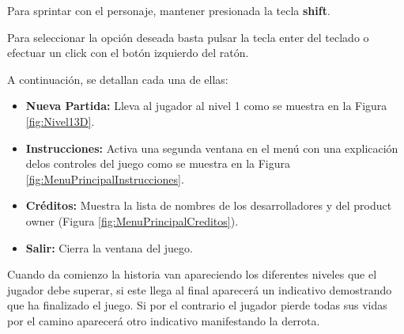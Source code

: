 Para sprintar con el personaje, mantener presionada la tecla \textbf{shift}.

Para seleccionar la opción deseada basta pulsar la tecla enter del teclado o efectuar un click con el botón izquierdo del ratón.

A continuación, se detallan cada una de ellas: 
\begin{itemize}
	\item \textbf{Nueva Partida:} Lleva al jugador al nivel 1 como se muestra en la Figura \ref{fig:Nivel13D}.	
	\item \textbf{Instrucciones:} Activa una segunda ventana en el menú con una explicación delos controles del juego como se muestra en la Figura \ref{fig:MenuPrincipalInstrucciones}.
	\item \textbf{Créditos:} Muestra la lista de nombres de los desarrolladores y del product owner (Figura \ref{fig:MenuPrincipalCreditos}).  
	\item \textbf{Salir:} Cierra la ventana del juego. 
\end{itemize}

Cuando da comienzo la historia van apareciendo los diferentes niveles que el jugador debe superar, si este llega al final aparecerá un indicativo demostrando que ha finalizado el juego. Si por el contrario el jugador pierde todas sus vidas por el camino aparecerá otro indicativo manifestando la derrota. 